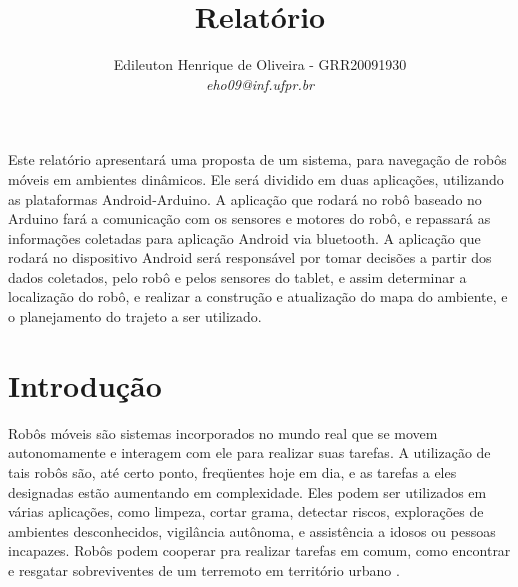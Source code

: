 \documentclass[12pt]{article}
\title{Relatório}
\author{Edileuton Henrique de Oliveira - GRR20091930\\{\em eho09@inf.ufpr.br}  }
\begin{document}
 

\maketitle

\begin{resumo} 

	Este relatório apresentará uma proposta de um sistema, para navegação de robôs móveis em ambientes dinâmicos. Ele será dividido em duas aplicações,
utilizando as plataformas Android\cite{androidSite}-Arduino\cite{arduinoSite}. A aplicação que rodará no robô baseado no Arduino fará a comunicação
com os sensores e motores do robô, e repassará as informações coletadas para aplicação Android via bluetooth. A aplicação que rodará no dispositivo Android
será responsável por tomar decisões a partir dos dados coletados, pelo robô e pelos sensores do tablet, e assim determinar a localização do robô, e realizar a
construção e atualização do mapa do ambiente, e o planejamento do trajeto a ser utilizado.
	

\end{resumo}

\section{Introdução}
    
	Robôs móveis são sistemas incorporados no mundo real que se movem autonomamente e interagem com ele para realizar suas tarefas\cite{construcaoMapas2}. 
	A utilização de tais robôs são, até certo ponto, freqüentes hoje em dia, e as tarefas a eles designadas estão aumentando em complexidade.
Eles podem ser utilizados em várias aplicações, como limpeza, cortar grama, detectar riscos, explorações de ambientes desconhecidos, 
vigilância autônoma, e assistência a idosos ou pessoas incapazes. 
Robôs podem cooperar pra realizar tarefas em comum,
como encontrar e resgatar sobreviventes de um terremoto em território urbano \cite{mobileRobotEnergy}. 
\end{document}
